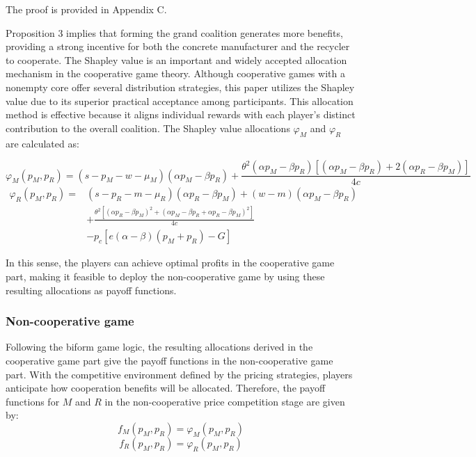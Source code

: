 \documentclass[authoryear,preprint,review,times,10pt]{elsarticle}
\begin{document}
 The proof is provided in Appendix C.

Proposition 3 implies that forming the grand coalition generates more benefits, providing a strong incentive for both the concrete manufacturer and the recycler to cooperate. 
The Shapley value is an important and widely accepted allocation mechanism in the cooperative game theory. Although cooperative games with a nonempty core offer several distribution strategies, this paper utilizes the Shapley value due to its superior practical acceptance among participants. This allocation method is effective because it aligns individual rewards with each player's distinct contribution to the overall coalition. The Shapley value allocations $\varphi_M$ and $\varphi_R$ are calculated as:

\begin{equation}
\varphi_M(p_M, p_R) = (s - p_M - w - \mu_M)(\alpha p_M - \beta p_R) + \frac{\theta^2(\alpha p_M - \beta p_R)[(\alpha p_M - \beta p_R) + 2(\alpha p_R - \beta p_M)]}{4c}
\end{equation}
\begin{equation}
\begin{aligned}
\varphi_R(p_M, p_R) =& (s - p_R - m - \mu_R)(\alpha p_R - \beta p_M) + (w - m)(\alpha p_M - \beta p_R) \\
&+ \frac{\theta^2[(\alpha p_R - \beta p_M)^2 + (\alpha p_M - \beta p_R + \alpha p_R - \beta p_M)^2]}{4c} \\
&- p_c[e(\alpha - \beta)(p_M + p_R) - G]
\end{aligned}
\end{equation}

In this sense, the players can achieve optimal profits in the cooperative game part, making it feasible to deploy the non-cooperative game by using these resulting allocations as payoff functions.

\subsubsection{Non-cooperative game}
\label{sec:noncooperative_game}

Following the biform game logic, the resulting allocations derived in the cooperative game part give the payoff functions in the non-cooperative game part. With the competitive environment defined by the pricing strategies, players anticipate how cooperation benefits will be allocated. Therefore, the payoff functions for $M$ and $R$ in the non-cooperative price competition stage are given by:
\begin{equation}
f_M(p_M, p_R) = \varphi_M(p_M, p_R)
\end{equation}
\begin{equation}
f_R(p_M, p_R) = \varphi_R(p_M, p_R)
\end{equation}
\end{document}
